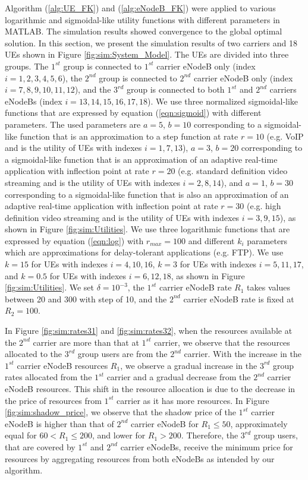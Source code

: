 \documentclass[conference]{IEEEtran}
\begin{document}
Algorithm (\ref{alg:UE_FK}) and (\ref{alg:eNodeB_FK}) were applied to various logarithmic and sigmoidal-like utility functions with different parameters in MATLAB. The simulation results showed convergence to the global optimal solution. In this section, we present the simulation results of two carriers and 18 UEs shown in Figure \ref{fig:sim:System_Model}. The UEs are divided into three groups. The $1^{st}$ group is connected to $1^{st}$ carrier eNodeB only (index $i=1,2,3,4,5,6$), the $2^{nd}$ group is connected to $2^{nd}$ carrier eNodeB only (index $i=7,8,9,10,11,12$), and the $3^{rd}$ group is connected to both $1^{st}$ and $2^{nd}$ carriers eNodeBs (index $i=13,14,15,16,17,18$). We use three normalized sigmoidal-like functions that are expressed by equation (\ref{eqn:sigmoid}) with different parameters. The used parameters are $a = 5$, $b=10$ corresponding to a sigmoidal-like function that is an approximation to a step function at rate $r =10$ (e.g. VoIP and is the utility of UEs with indexes $i=1,7,
13$), $a = 3$, $b=20$ corresponding to a sigmoidal-like function that is an approximation of an adaptive real-time application with inflection point at rate $r=20$ (e.g. standard definition video streaming and is the utility of UEs with indexes $i=2,8,14$), and $a = 1$,  $b=30$ corresponding to a sigmoidal-like function that is also an approximation of an adaptive real-time application with inflection point at rate $r=30$ (e.g. high definition video streaming and is the utility of UEs with indexes $i=3,9,15$), as shown in Figure \ref{fig:sim:Utilities}. We use three logarithmic functions that are expressed by equation (\ref{eqn:log}) with $r_{max} =100$ and different $k_i$ parameters which are approximations for delay-tolerant applications (e.g. FTP). We use $k =15$ for UEs with indexes $i=4,10,16$, $k =3$ for UEs with indexes $i=5,11,17$, and $k = 0.5$ for UEs with indexes $i=6,12,18$, as shown in Figure \ref{fig:sim:Utilities}. We set $\delta =10^{-3}$, the $1^{st}$ carrier eNodeB rate $R_1$ takes values 
between 20 and 300 with step of 10, and the $2^{nd}$ carrier eNodeB rate is fixed at $R_2 = 100$. 

In Figure \ref{fig:sim:rates31} and \ref{fig:sim:rates32}, when the resources available at the $2^{nd}$ carrier are more than that at $1^{st}$ carrier, we observe that the resources allocated to the $3^{rd}$ group users are from the $2^{nd}$ carrier. With the increase in the $1^{st}$ carrier eNodeB resources $R_1$, we observe a gradual increase in the $3^{rd}$ group rates allocated from the $1^{st}$ carrier and a gradual decrease from the $2^{nd}$ carrier eNodeB resources. This shift in the resource allocation is due to the decrease in the price of resources from $1^{st}$ carrier as it has more resources. In Figure \ref{fig:sim:shadow_price}, we observe that the shadow price of the $1^{st}$ carrier eNodeB is higher than that of $2^{nd}$ carrier eNodeB for $R_1\leq 50$, approximately equal for $60<R_1\leq200$, and lower for $R_1>200$. Therefore, the $3^{rd}$ group users, that are covered by $1^{st}$ and $2^{nd}$ carrier eNodeBs, receive the minimum price for resources by aggregating resources from both 
eNodeBs as intended by our algorithm.
\end{document}

